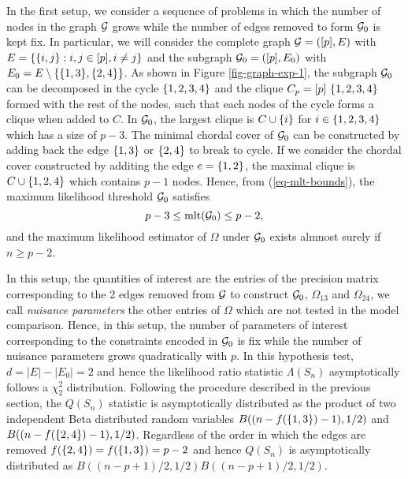 In the first setup, we consider a sequence of problems in which the number of nodes in the graph ${\mathcal{G}}$ grows while the number of edges removed to form ${\mathcal{G}}_0$ is kept fix. In particular, we will consider the complete graph ${\mathcal{G}} = ([p], E)$ with $E = {\left\{{\left\{i, j\right\}} : i, j \in [p], i \neq j\right\}}$ and the subgraph ${\mathcal{G}}_0 = ([p], E_0)$ with $E_0 = E \setminus {\left\{{\left\{1, 3\right\}}, {\left\{2, 4\right\}}\right\}}$. As shown in Figure \ref{fig-graph-exp-1}, the subgraph ${\mathcal{G}}_0$ can be decomposed in the cycle ${\left\{1, 2, 3, 4\right\}}$ and the clique $C_p = [p] \ {\left\{1,2,3,4\right\}}$ formed with the rest of the nodes, such that each nodes of the cycle forms a clique when added to $C$. In ${\mathcal{G}}_0$, the largest clique is $C \cup {\left\{i\right\}}$ for $i \in {\left\{1, 2, 3, 4\right\}}$ which has a size of $p - 3$. The minimal chordal cover of ${\mathcal{G}}_0$ can be constructed by adding back the edge ${\left\{1, 3\right\}}$ or ${\left\{2, 4\right\}}$ to break to cycle. If we consider the chordal cover constructed by additing the edge $e = {\left\{1, 2\right\}}$, the maximal clique is $C \cup {\left\{1, 2, 4\right\}}$ which contains $p - 1$ nodes. Hence, from (\ref{eq-mlt-bounds}), the maximum likelihood threshold ${\mathcal{G}}_0$ satisfies
\begin{equation*}
    p - 3 \leq {\textrm{mlt}}({\mathcal{G}}_0) \leq p - 2,
\end{equation*}
and the maximum likelihood estimator of $\Omega$ under ${\mathcal{G}}_0$ exists almnost surely if $n \geq p - 2$.

In this setup, the quantities of interest are the entries of the precision matrix corresponding to the 2 edges removed from ${\mathcal{G}}$ to construct ${\mathcal{G}}_0$, $\Omega_{13}$ and $\Omega_{24}$, we call \textit{nuisance parameters} the other entries of $\Omega$ which are not tested in the model comparison. Hence, in this setup, the number of parameters of interest corresponding to the constraints encoded in ${\mathcal{G}}_0$ is fix while the number of nuisance parameters grows quadratically with $p$.  In this hypothesis test, $d = |E| - |E_0| = 2$ and hence the likelihood ratio statistic $\Lambda(S_n)$ asymptotically follows a $\chi^2_2$ distribution. Following the procedure described in the previous section, the $Q(S_n)$ statistic is asymptotically distributed as the product of two independent Beta distributed random variables $B((n - f({\left\{1,3\right\}}) - 1), 1/2)$ and $B((n - f({\left\{2,4\right\}}) - 1), 1/2)$. Regardless of the order in which the edges are removed $f({\left\{2,4\right\}}) = f({\left\{1, 3\right\}}) = p - 2$ and hence $Q(S_n)$ is asymptotically distributed as $B((n-p+1)/2, 1/2)B((n-p+1)/2, 1/2)$.



